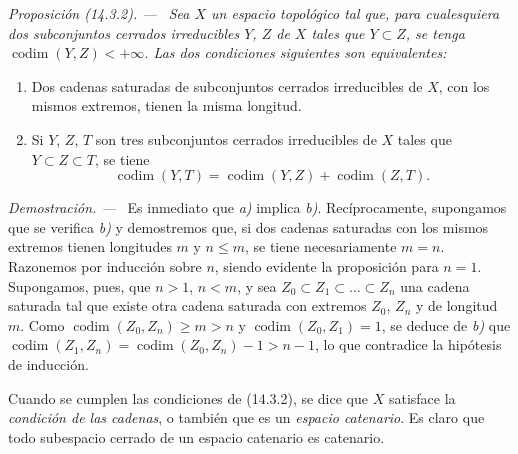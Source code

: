 \documentclass[10pt,oneside]{book}
\makeatletter
\newcommand{\setmanualcurrentlabel}[1]{\def\@currentlabel{#1}}
\newcommand{\oldpage}[2][]{%
  \setcounter{footnote}{0}%
  \marginpar{\scriptsize\textbf{#1}~|~#2}\ignorespaces}
\newenvironment{proposition}[1][]{%
  \setmanualcurrentlabel{#1}\par\medskip\noindent\itshape Proposición (#1). ---\ }{\par}
\newenvironment{proof}{%
  \par\medskip\noindent\textit{Demostración. ---\ }}{\par}
\makeatother
\begin{document}
\begin{proposition}[14.3.2]
\label{0.14.3.2-es}
Sea $X$ un espacio topológico tal que, para cualesquiera dos subconjuntos
cerrados irreducibles $Y$, $Z$ de $X$ tales que $Y\subset Z$, se tenga
$\operatorname{codim}(Y,Z)<+\infty$. Las dos condiciones siguientes son
equivalentes:
\begin{enumerate}
  \item[\rm(a)] Dos cadenas saturadas de subconjuntos cerrados irreducibles de $X$,
  con los mismos extremos, tienen la misma longitud.
  \item[\rm(b)] Si $Y$, $Z$, $T$ son tres subconjuntos cerrados irreducibles de
  $X$ tales que $Y\subset Z\subset T$, se tiene
  \[
    \operatorname{codim}(Y,T)=
    \operatorname{codim}(Y,Z)+\operatorname{codim}(Z,T).
    \tag{14.3.2.1}\label{0.14.3.2.1-es}
  \]
\end{enumerate}
\end{proposition}

\begin{proof}
Es inmediato que \emph{a)} implica \emph{b)}. Recíprocamente, supongamos que se verifica \emph{b)} y
demostremos que, si dos cadenas saturadas con los mismos extremos tienen
longitudes $m$ y $n\leq m$, se tiene necesariamente $m=n$. Razonemos por
inducción sobre $n$, siendo evidente la proposición para $n=1$. Supongamos,
pues, que $n>1$, $n<m$, y sea $Z_0\subset Z_1\subset\ldots\subset Z_n$ una
\oldpage[0\textsubscript{IV-1}]{11}
cadena saturada tal que existe otra cadena saturada con extremos
$Z_0$, $Z_n$ y de longitud $m$. Como
$\operatorname{codim}(Z_0,Z_n)\geq m>n$ y
$\operatorname{codim}(Z_0,Z_1)=1$, se deduce de \emph{b)} que
$\operatorname{codim}(Z_1,Z_n)=\operatorname{codim}(Z_0,Z_n)-1>n-1$, lo que
contradice la hipótesis de inducción.
\end{proof}

Cuando se cumplen las condiciones de (14.3.2), se dice que $X$ satisface la
\emph{condición de las cadenas}, o también que es un \emph{espacio catenario}.
Es claro que todo subespacio cerrado de un espacio catenario es catenario.
\end{document}

